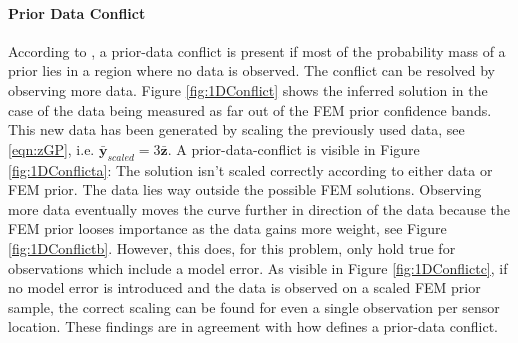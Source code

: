 \documentclass[%
  a4paper,oneside,%
  11pt,%
  smallchapters,
  style=printdev,
  extramargin,
  green,%
  rgb, <cmyk>
  ]{tubsbook}
\begin{document}
\paragraph{Prior Data Conflict}
According to \cite{Evans2006}, a prior-data conflict is present if most of the probability mass of a prior lies in a region where no data is observed. The conflict can be resolved by observing more data.
Figure \ref{fig:1DConflict} shows the inferred solution in the case of the data being measured as far out of the FEM prior confidence bands. This new data has been generated by scaling the previously used data, see \eqref{eqn:zGP}, i.e. $\bm{\bar{y}}_{scaled} = 3 \bar{\bm{z}}$. A prior-data-conflict is visible in Figure \ref{fig:1DConflicta}: The solution isn't scaled correctly according to either data or FEM prior. The data lies way outside the possible FEM solutions. Observing more data eventually moves the curve further in direction of the data because the FEM prior looses importance as the data gains more weight, see Figure \ref{fig:1DConflictb}. However, this does, for this problem, only hold true for observations which include a model error. As visible in Figure \ref{fig:1DConflictc}, if no model error is introduced and the data is observed on a scaled FEM prior sample, the correct scaling can be found for even a single observation per sensor location. These findings are in agreement with how \cite{Evans2006} defines a prior-data conflict. %
%
\end{document}
